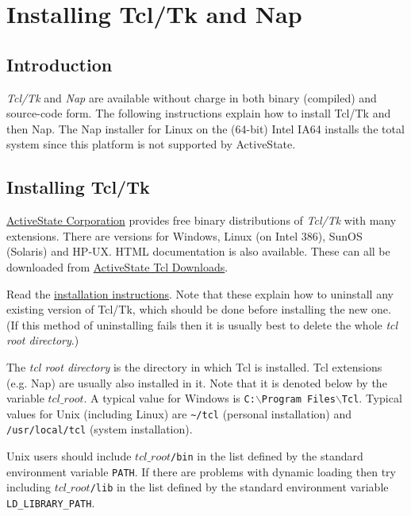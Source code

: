 
\section{Installing Tcl/Tk and Nap}

\subsection{Introduction}
    \label{install-Introduction}

  \emph{Tcl/Tk} and 
  \emph{Nap} are available without charge in both binary (compiled)
  and source-code form. The following instructions explain how to
  install Tcl/Tk and then Nap. The Nap installer for Linux on the
  (64-bit) Intel IA64 installs the total system since this platform is
  not supported by ActiveState.

\subsection{Installing Tcl/Tk}
    \label{install-Installing-Tcl-Tk}

  \href{http://aspn.activestate.com/ASPN//}{ActiveState Corporation} provides free binary distributions of 
  \emph{Tcl/Tk} with many extensions. There are versions for Windows,
  Linux (on Intel 386), SunOS (Solaris) and HP-UX. HTML documentation
  is also available. These can all be downloaded from 
  \href{http://aspn.activestate.com/ASPN/Tcl/Downloads/}{ActiveState Tcl Downloads}.
  
 Read the 
  \href{http://aspn.activestate.com/ASPN/docs/ActiveTcl/at.install.html}{ installation instructions}. Note that these explain how to
  uninstall any existing version of Tcl/Tk, which should be done before
  installing the new one. (If this method of uninstalling fails then it
  is usually best to delete the whole 
  \emph{tcl root directory}.)
  
 The 
  \emph{tcl root directory} is the directory in which Tcl is
  installed. Tcl extensions (e.g. Nap) are usually also installed in
  it. Note that it is denoted below by the variable 
  $tcl\_root$. A typical value for Windows is 
  \texttt{C:$\backslash$Program\ Files$\backslash$Tcl}. Typical values for Unix
  (including Linux) are 
  \verb!~/tcl! (personal installation) and 
  \verb!/usr/local/tcl! (system installation).
  
 Unix users should include 
  $tcl\_root$\texttt{/bin} in the list defined by the standard environment
  variable 
  \texttt{PATH}. If there are problems with dynamic loading then
  try including 
  $tcl\_root$\texttt{/lib} in the list defined by the standard environment
  variable 
  \texttt{LD\_LIBRARY\_PATH}.
  
